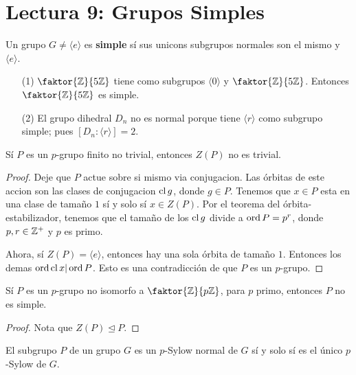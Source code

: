 \section*{Lectura 9: Grupos Simples}

\begin{definition}
    Un grupo $G \neq \langle e \rangle$ es \textbf{simple} s\'i sus unicons
    subgrupos normales son el mismo y $\langle e \rangle$.
\end{definition}

\begin{example}\label{}
    \begin{enumerate}
        \item[(1)] $\faktor{\Z}{5\Z}$ tiene como subgrupos $\langle 0 \rangle$ y
            $\faktor{\Z}{5\Z}$. Entonces $\faktor{\Z}{5\Z}$ es simple.

        \item[(2)] El grupo dihedral $D_n$ no es normal porque tiene  $\langle r
            \rangle$ como subgrupo simple; pues $[D_n:\langle r \rangle]=2$.
    \end{enumerate}
\end{example}

\begin{lemma}\label{9.38}
    S\'i $P$ es un  $p$-grupo finito no trivial, entonces $Z(P)$ no es trivial.
\end{lemma}
\begin{proof}
    Deje que $P$ actue sobre si mismo via conjugacion. Las \'orbitas de este
    accion son las clases de conjugacion $\operatorname{cl}{g}$, donde $g \in P$. Tenemos que
    $x \in P$ esta en una clase de tama\~no  $1$ s\'i y solo s\'i $x \in Z(P)$.
    Por el teorema del \'orbita-estabilizador, tenemos que el tama\~no de los
    $\operatorname{cl}{g}$ divide a $\operatorname{ord}{P}=p^r$, donde $p,r \in \mathbb{Z}^+$ y $p$ es primo.

    Ahora, s\'i  $Z(P)=\langle e \rangle$, entonces hay una sola \'orbita de
    tama\~no $1$. Entonces los demas $\operatorname{ord}{\operatorname{cl}{x}} | \operatorname{ord}{P}$. Esto es una
    contradicci\'on de que $P$ es un $p$-grupo.
\end{proof}
\begin{corollary}
    S\'i $P$ es un $p$-grupo  no isomorfo a $\faktor{\Z}{p\Z}$, para $p$ primo,
    entonces  $P$ no es simple.
\end{corollary}
\begin{proof}
    Nota que $Z(P) \unlhd P$.
\end{proof}

\begin{lemma}\label{9.39}
    El subgrupo $P$ de un grupo $G$ es un $p$-Sylow normal de $G$ s\'i y solo
    s\'i es el \'unico $p$-Sylow de $G$.
\end{lemma}

